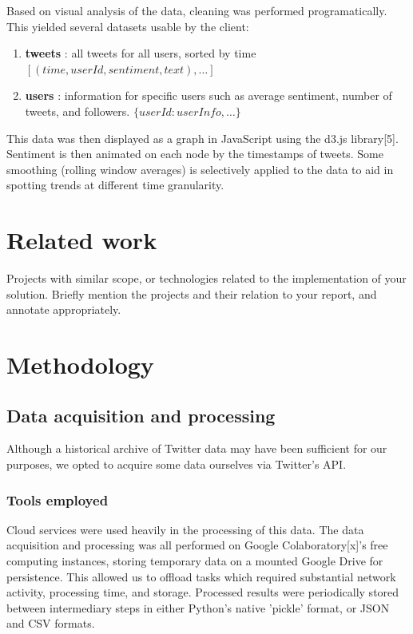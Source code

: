 \documentclass[12pt]{article}
\begin{document}
Based on visual analysis of the data, cleaning was performed programatically. This yielded several datasets usable by the client:
\begin{enumerate}
    \item \textbf{tweets} : all tweets for all users, sorted by time $[(time, userId, sentiment, text), \dots]$
    \item \textbf{users} : information for specific users such as average sentiment, number of tweets, and followers. $\{userId: userInfo, \dots\}$
\end{enumerate}

This data was then displayed as a graph in JavaScript using the d3.js library[5]. Sentiment is then animated on each node by the timestamps of tweets. Some smoothing (rolling window averages) is selectively applied to the data to aid in spotting trends at different time granularity.


\section{Related work}
Projects with similar scope, or technologies related to the implementation of your solution. Briefly mention the projects and their relation to your report, and annotate appropriately.


\section{Methodology}

\subsection{Data acquisition and processing}

Although a historical archive of Twitter data may have been sufficient for our purposes, we opted to acquire some data ourselves via Twitter's API.

\subsubsection{Tools employed}

Cloud services were used heavily in the processing of this data. The data acquisition and processing was all performed on Google Colaboratory[x]'s free computing instances, storing temporary data on a mounted Google Drive for persistence. This allowed us to offload tasks which required substantial network activity, processing time, and storage. Processed results were periodically stored between intermediary steps in either Python's native 'pickle' format, or JSON and CSV formats.\newline
\end{document}
